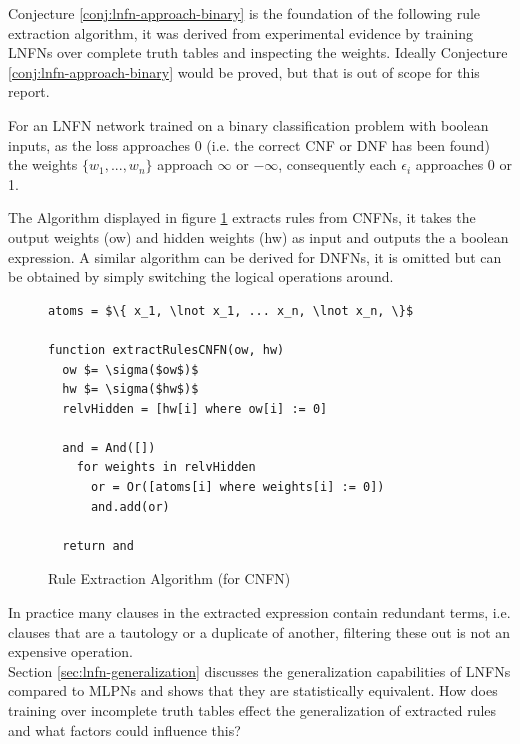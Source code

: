 Conjecture \ref{conj:lnfn-approach-binary} is the foundation of the following rule extraction algorithm, it was derived from experimental evidence by training LNFNs over complete truth tables and inspecting the weights. Ideally Conjecture \ref{conj:lnfn-approach-binary} would be proved, but that is out of scope for this report.

\begin{conjecture}
	For an LNFN network trained on a binary classification problem with boolean inputs, as the loss approaches 0  (i.e. the correct CNF or DNF has been found) the weights $\{ w_1, ..., w_n \}$ approach $\infty$ or $-\infty$, consequently each $\epsilon_i$ approaches 0 or 1.
	\label{conj:lnfn-approach-binary}
\end{conjecture}

The Algorithm displayed in figure \ref{alg:rule-extraction} extracts rules from CNFNs, it takes the output weights (ow) and hidden weights (hw) as input and outputs the a boolean expression. A similar algorithm can be derived for DNFNs, it is omitted but can be obtained by simply switching the logical operations around.

\begin{figure}[H]
	\begin{lstlisting}[mathescape=true]
atoms = $\{ x_1, \lnot x_1, ... x_n, \lnot x_n, \}$
	
function extractRulesCNFN(ow, hw)
  ow $= \sigma($ow$)$
  hw $= \sigma($hw$)$
  relvHidden = [hw[i] where ow[i] := 0]
		
  and = And([])
    for weights in relvHidden
      or = Or([atoms[i] where weights[i] := 0])
      and.add(or)
		
  return and
	\end{lstlisting}
	\caption{Rule Extraction Algorithm (for CNFN)}
	\label{alg:rule-extraction}
\end{figure}

In practice many clauses in the extracted expression contain redundant terms, i.e. clauses that are a tautology or a duplicate of another, filtering these out is not an expensive operation.\\

Section \ref{sec:lnfn-generalization} discusses the generalization capabilities of LNFNs compared to MLPNs and shows that they are statistically equivalent. How does training over incomplete truth tables effect the generalization of extracted rules and what factors could influence this?\\

